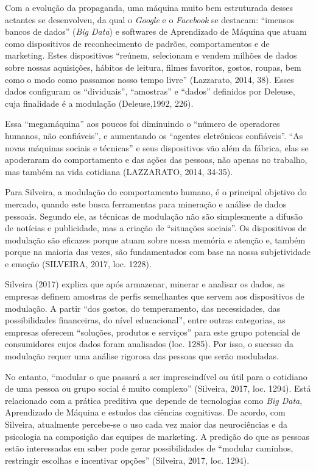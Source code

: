 Com a evolução da propaganda, uma máquina muito bem estruturada desses
actantes se desenvolveu, da qual o \emph{Google} e o \emph{Facebook} se
destacam: ``imensos bancos de dados'' (\emph{Big Data}) e softwares de
Aprendizado de Máquina que atuam como dispositivos de reconhecimento de
padrões, comportamentos e de marketing. Estes dispositivos ``reúnem,
selecionam e vendem milhões de dados sobre nossas aquisições, hábitos de
leitura, filmes favoritos, gostos, roupas, bem como o modo como passamos
nosso tempo livre'' (Lazzarato, 2014, 38). Esses dados configuram os
``dividuais'', ``amostras'' e ``dados'' definidos por Deleuse, cuja
finalidade é a modulação (Deleuse,1992, 226).

Essa ``megamáquina'' aos poucos foi diminuindo o ``número de operadores
humanos, não confiáveis'', e aumentando os ``agentes eletrônicos
confiáveis''. ``As novas máquinas sociais e técnicas'' e seus
dispositivos vão além da fábrica, elas se apoderaram do comportamento e
das ações das pessoas, não apenas no trabalho, mas também na vida
cotidiana (LAZZARATO, 2014, 34-35).

Para Silveira, a modulação do comportamento humano, é o principal
objetivo do mercado, quando este busca ferramentas para mineração e
análise de dados pessoais. Segundo ele, as técnicas de modulação não são
simplesmente a difusão de notícias e publicidade, mas a criação de
``situações sociais''. Os dispositivos de modulação são eficazes porque
atuam sobre nossa memória e atenção e, também porque na maioria das
vezes, são fundamentados com base na nossa subjetividade e emoção
(SILVEIRA, 2017, loc. 1228).

Silveira (2017) explica que após armazenar, minerar e analisar os dados,
as empresas definem amostras de perfis semelhantes que servem aos
dispositivos de modulação. A partir ``dos gostos, do temperamento, das
necessidades, das possibilidades financeiras, do nível educacional'',
entre outras categorias, as empresas oferecem ``soluções, produtos e
serviços'' para este grupo potencial de consumidores cujos dados foram
analisados (loc. 1285). Por isso, o sucesso da modulação requer uma
análise rigorosa das pessoas que serão moduladas.

No entanto, ``modular o que passará a ser imprescindível ou útil para o
cotidiano de uma pessoa ou grupo social é muito complexo'' (Silveira,
2017, loc. 1294). Está relacionado com a prática preditiva que depende
de tecnologias como \emph{Big Data}, Aprendizado de Máquina e estudos
das ciências cognitivas. De acordo, com Silveira, atualmente percebe-se
o uso cada vez maior das neurociências e da psicologia na composição das
equipes de marketing. A predição do que as pessoas estão interessadas em
saber pode gerar possibilidades de ``modular caminhos, restringir
escolhas e incentivar opções'' (Silveira, 2017, loc. 1294).

